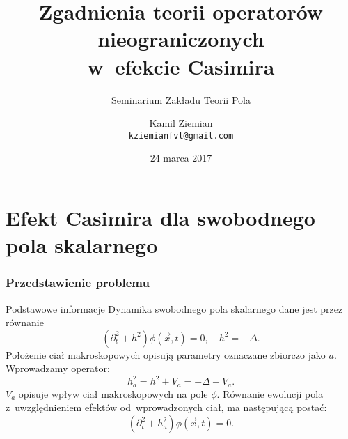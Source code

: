 \documentclass{beamer} \mode<presentation>
\title[]{Zgadnienia teorii operatorów nieograniczonych \\
  w~efekcie Casimira}
\subtitle{Seminarium Zakładu Teorii Pola}
\author{Kamil Ziemian \\
  \texttt{kziemianfvt@gmail.com} }
\institute{Uniwersytet Jagielloński w Krakowie}
\date[24 marca 2017]{24 marca 2017}
\newcommand{\Del}{\Delta}
\newcommand{\pr}{\partial}
\newcommand{\vecx}{\vec{ x }}
\begin{document}




\begin{frame}
\titlepage
\end{frame}



\begin{frame}
\tableofcontents
\end{frame}



\section{Efekt Casimira dla swobodnego pola skalarnego}


\begin{frame}
  \frametitle{Przedstawienie problemu}


  \begin{block}{Podstawowe informacje}
    Dynamika swobodnego pola skalarnego dane jest przez równanie
    \begin{equation}
      \label{eq:EC01}
      ( \pr^{ 2 }_{ t } + h^{ 2 }) \phi( \vecx, t ) = 0, \quad h^{ 2 } = -\Del.
    \end{equation}
    Położenie ciał makroskopowych opisują parametry oznaczane zbiorczo
    jako $a$. Wprowadzamy operator:
    \begin{equation}
      \label{eq:EC02}
      h_{ a }^{ 2 } = h^{ 2 } + V_{ a } = -\Del + V_{ a }.
    \end{equation}
    $V_{ a }$ opisuje wpływ ciał makroskopowych na pole $\phi$.
    Równanie ewolucji pola z~uwzględnieniem efektów od~wprowadzonych
    ciał, ma następującą postać:
    \begin{equation}
      \label{eq:EC03}
      ( \pr^{ 2 }_{ t } + h_{ a }^{ 2 }) \phi( \vecx, t ) = 0.
    \end{equation}
  \end{block}

\end{frame}
\end{document}
